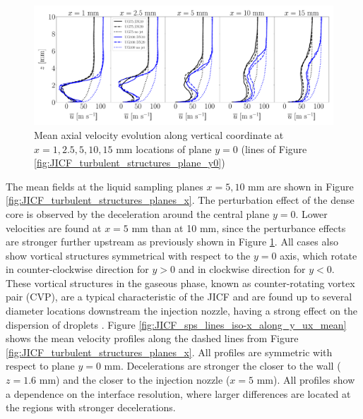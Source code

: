 \begin{figure}[ht]
\flushleft
   \includegraphics[scale=0.24]{./part2_developments/figures_ch5_resolved_JICF/turbulent_structures/lines_y0_along_z_ux_mean}
\caption{Mean axial velocity evolution along vertical coordinate at $x = 1, 2.5, 5, 10, 15$ mm locations of plane $y = 0$ (lines of Figure \ref{fig:JICF_turbulent_structures_plane_y0})}
\label{fig:JICF_sps_lines_y0_along_z_ux_mean}
\end{figure}


The mean fields at the liquid sampling planes $x = 5, 10$ mm are shown in Figure \ref{fig:JICF_turbulent_structures_planes_x}.  The perturbation effect of the dense core is observed by the deceleration around the central plane $y = 0$. Lower velocities are found at $x = 5$ mm than at 10 mm, since the perturbance effects are stronger further upstream as previously shown in Figure \ref{fig:JICF_sps_lines_y0_along_z_ux_mean}. All cases also show vortical structures symmetrical with respect to the $y = 0$ axis, which rotate in counter-clockwise direction for $y > 0$ and in clockwise direction for  $y < 0$. These vortical structures in the gaseous phase, known as counter-rotating vortex pair (CVP), are a typical characteristic of the JICF and are found up to several diameter locations downstream the injection nozzle, having a strong effect on the dispersion of droplets . Figure \ref{fig:JICF_sps_lines_iso-x_along_y_ux_mean} shows the mean velocity profiles along the dashed lines from Figure \ref{fig:JICF_turbulent_structures_planes_x}. All profiles are symmetric with respect to plane $y = 0$ mm. Decelerations are stronger the closer to the wall ($z = 1.6$ mm) and the closer to the injection nozzle ($x = 5$ mm). All profiles show a dependence on the interface resolution, where larger differences are located at the regions with stronger decelerations. %

